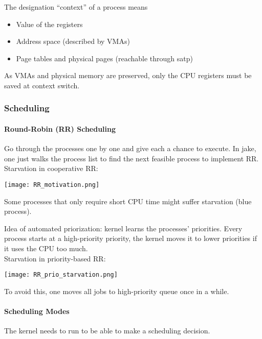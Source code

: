 \newpar{}

The designation ``context'' of a process means
\begin{itemize}
    \item Value of the registers
    \item Address space (described by VMAs)
    \item Page tables and physical pages (reachable through satp)
\end{itemize}
As VMAs and physical memory are preserved, only the CPU registers must be saved at context switch.

\subsubsection{Scheduling}
\paragraph{Round-Robin (RR) Scheduling}

Go through the processes one by one and give each a chance to execute. In jake, one just walks the process list to find the next feasible process to implement RR.\\
Starvation in cooperative RR:
\begin{center}
    \texttt{[image: RR\_motivation.png]}
\end{center}
Some processes that only require short CPU time might suffer starvation (blue process).

\newpar{}

Idea of automated priorization: kernel learns the processes' priorities. Every process starts at a high-priority priority, the kernel moves it to lower priorities if it uses the CPU too much.\\
Starvation in priority-based RR:
\begin{center}
    \texttt{[image: RR\_prio\_starvation.png]}
\end{center}
To avoid this, one moves all jobs to high-priority queue once in a while.

\paragraph{Scheduling Modes}
The kernel needs to run to be able to make a scheduling decision.

\newpar{}

